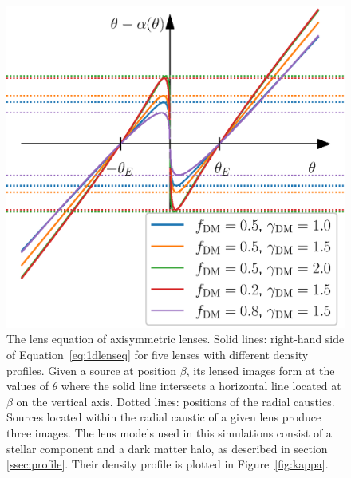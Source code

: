 \documentclass{aa}
\def\Fref#1{Figure~\ref{#1}\xspace}
\def\Eref#1{Equation~\ref{#1}\xspace}
\begin{document}
\begin{figure}
\includegraphics[width=\columnwidth]{composite_fixedap_scheme.eps}
\caption{
The lens equation of axisymmetric lenses. Solid lines: right-hand side of \Eref{eq:1dlenseq} for five lenses with different density profiles. 
Given a source at position $\beta$, its lensed images form at the values of $\theta$ where the solid line intersects a horizontal line located at $\beta$ on the vertical axis. 
Dotted lines: positions of the radial caustics. Sources located within the radial caustic of a given lens produce three images.
The lens models used in this simulations consist of a stellar component and a dark matter halo, as described in section \ref{ssec:profile}. Their density profile is plotted in \Fref{fig:kappa}.
\label{fig:scheme}
}
\end{figure}
\end{document}
